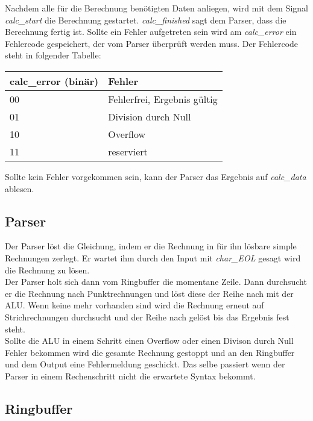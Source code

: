 Nachdem alle für die Berechnung benötigten Daten anliegen, wird mit dem Signal \textit{calc\_start} die Berechnung gestartet. \textit{calc\_finished}
sagt dem Parser, dass die Berechnung fertig ist. Sollte ein Fehler aufgetreten sein wird am \textit{calc\_error} ein Fehlercode gespeichert, der vom
Parser überprüft werden muss. Der Fehlercode steht in folgender Tabelle:

\begin{center}
\begin{tabular}[!ht]{|l|l|}
\hline calc\_error (binär) & Fehler\\
	\hline
	00 & Fehlerfrei, Ergebnis gültig\\ 
	01 & Division durch Null\\ 
	10 & Overflow\\ 
	11 & reserviert\\
 \hline
\end{tabular}
\end{center}

Sollte kein Fehler vorgekommen sein, kann der Parser das Ergebnis auf \textit{calc\_data} ablesen. 

\subsection{Parser}
Der Parser löst die Gleichung, indem er die Rechnung in für ihn lösbare simple Rechnungen zerlegt.
Er wartet ihm durch den Input mit \textit{char\_EOL} gesagt wird die Rechnung zu lösen.\\
Der Parser holt sich dann vom Ringbuffer die momentane Zeile. Dann durchsucht er die Rechnung nach 
Punktrechnungen und löst diese der Reihe nach mit der ALU. Wenn keine mehr vorhanden sind wird
die Rechnung erneut auf Strichrechnungen durchsucht und der Reihe nach gelöst bis das Ergebnis 
fest steht.\\
Sollte die ALU in einem Schritt einen Overflow oder einen Divison durch Null Fehler bekommen wird 
die gesamte Rechnung gestoppt und an den Ringbuffer und dem Output eine Fehlermeldung geschickt.
Das selbe passiert wenn der Parser in einem Rechenschritt nicht die erwartete Syntax bekommt.\\

\subsection{Ringbuffer}

